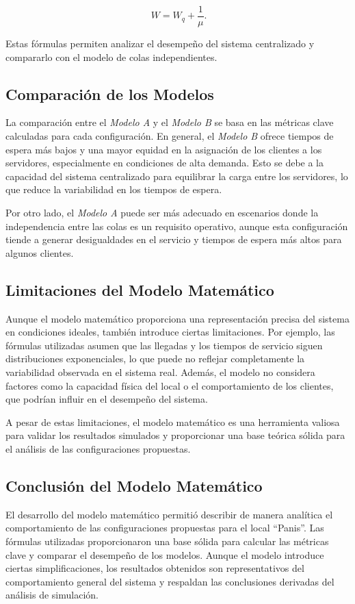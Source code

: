 \documentclass[a4paper,12pt]{article}
\begin{document}
\[\
W = W_q + \frac{1}{\mu}.
\]

Estas fórmulas permiten analizar el desempeño del sistema centralizado y compararlo con el modelo de colas independientes.

\subsection{Comparación de los Modelos}

La comparación entre el \textit{Modelo A} y el \textit{Modelo B} se basa en las métricas clave calculadas para cada configuración. En general, el \textit{Modelo B} ofrece tiempos de espera más bajos y una mayor equidad en la asignación de los clientes a los servidores, especialmente en condiciones de alta demanda. Esto se debe a la capacidad del sistema centralizado para equilibrar la carga entre los servidores, lo que reduce la variabilidad en los tiempos de espera.

Por otro lado, el \textit{Modelo A} puede ser más adecuado en escenarios donde la independencia entre las colas es un requisito operativo, aunque esta configuración tiende a generar desigualdades en el servicio y tiempos de espera más altos para algunos clientes.

\subsection{Limitaciones del Modelo Matemático}

Aunque el modelo matemático proporciona una representación precisa del sistema en condiciones ideales, también introduce ciertas limitaciones. Por ejemplo, las fórmulas utilizadas asumen que las llegadas y los tiempos de servicio siguen distribuciones exponenciales, lo que puede no reflejar completamente la variabilidad observada en el sistema real. Además, el modelo no considera factores como la capacidad física del local o el comportamiento de los clientes, que podrían influir en el desempeño del sistema.

A pesar de estas limitaciones, el modelo matemático es una herramienta valiosa para validar los resultados simulados y proporcionar una base teórica sólida para el análisis de las configuraciones propuestas.

\subsection{Conclusión del Modelo Matemático}

El desarrollo del modelo matemático permitió describir de manera analítica el comportamiento de las configuraciones propuestas para el local “Panis”. Las fórmulas utilizadas proporcionaron una base sólida para calcular las métricas clave y comparar el desempeño de los modelos. Aunque el modelo introduce ciertas simplificaciones, los resultados obtenidos son representativos del comportamiento general del sistema y respaldan las conclusiones derivadas del análisis de simulación.
\end{document}
